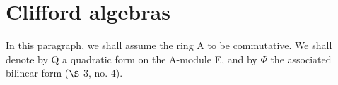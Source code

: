 \section{Clifford algebras}

In this paragraph, we shall assume the ring A to be commutative. We shall denote by Q a quadratic form on the A-module E, and by \(\Phi\) the associated bilinear form (\(\S\) 3, no. 4).

